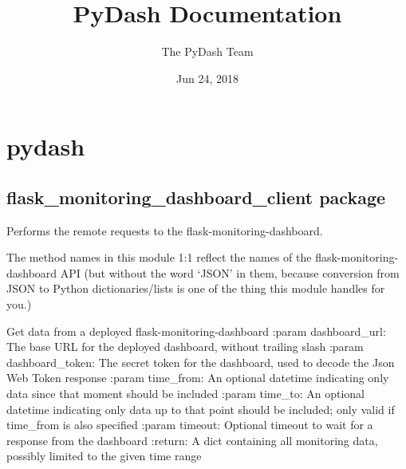 \documentclass[letterpaper,10pt,english]{sphinxmanual}
\title{PyDash Documentation}
\date{Jun 24, 2018}
\author{The PyDash Team}
\begin{document}
\maketitle
\sphinxtableofcontents
{}\label{\detokenize{index::doc}}



\chapter{pydash}
\label{\detokenize{modules::doc}}\label{\detokenize{modules:pydash}}\label{\detokenize{modules:welcome-to-pydash-s-documentation}}

\section{flask\_monitoring\_dashboard\_client package}
\label{\detokenize{flask_monitoring_dashboard_client::doc}}\label{\detokenize{flask_monitoring_dashboard_client:module-flask_monitoring_dashboard_client}}\label{\detokenize{flask_monitoring_dashboard_client:flask-monitoring-dashboard-client-package}}
Performs the remote requests to the flask-monitoring-dashboard.

The method names in this module 1:1 reflect the names of the flask-monitoring-dashboard API
(but without the word ‘JSON’ in them, because conversion from JSON to Python dictionaries/lists
is one of the thing this module handles for you.)

\begin{fulllineitems}
\label{\detokenize{flask_monitoring_dashboard_client:flask_monitoring_dashboard_client.get_data}}
Get data from a deployed flask-monitoring-dashboard
:param dashboard\_url: The base URL for the deployed dashboard, without trailing slash
:param dashboard\_token: The secret token for the dashboard, used to decode the Json Web Token response
:param time\_from: An optional datetime indicating only data since that moment should be included
:param time\_to: An optional datetime indicating only data up to that point should be included;
only valid if time\_from is also specified
:param timeout: Optional timeout to wait for a response from the dashboard
:return: A dict containing all monitoring data, possibly limited to the given time range

\end{fulllineitems}
\end{document}
